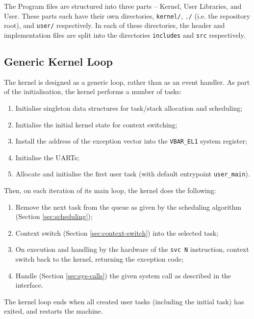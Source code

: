 \documentclass[12pt]{article}
\begin{document}
    The Program files are structured into three parts -- Kernel, User Libraries, and User. These parts each have their own directories, \verb`kernel/`, \verb`./` (i.e. the repository root), and \verb`user/` respectively. In each of these directories, the header and implementation files are split into the directories \verb`includes` and \verb`src` respectively.
    
    \subsection{Generic Kernel Loop}
    \label{sec:main}
    
    The kernel is designed as a generic loop, rather than as an event handler. As part of the initialisation, the kernel performs a number of tasks:
    \begin{enumerate}[(1)]
        \item Initialise singleton data structures for task/stack allocation and scheduling;
        \item Initialise the initial kernel state for context switching;
        \item Install the address of the exception vector into the \verb`VBAR_EL1` system register;
        \item Initialise the UARTs;
        \item Allocate and initialise the first user task (with default entrypoint \verb`user_main`).
    \end{enumerate}
    
    Then, on each iteration of its main loop, the kernel does the following:
    \begin{enumerate}[(1)]
        \item Remove the next task from the queue as given by the scheduling algorithm (Section \ref{sec:scheduling});
        \item Context switch (Section \ref{sec:context-switch}) into the selected task;
        \item On execution and handling by the hardware of the \verb`svc N` instruction, context switch back to the kernel, returning the exception code;
        \item Handle (Section \ref{sec:sys-calls}) the given system call as described in the interface.
    \end{enumerate}
    
    The kernel loop ends when all created user tasks (including the initial task) has exited, and restarts the machine.
    
\end{document}
